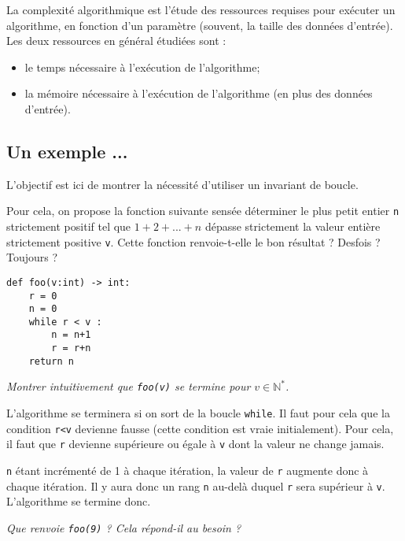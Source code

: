 \begin{defi}[Complexité]
  La complexité algorithmique est l'étude des ressources requises pour exécuter un algorithme, en fonction d'un paramètre (souvent, la taille des données d'entrée). Les deux ressources en général étudiées sont :
\begin{itemize}
\item le temps nécessaire à l'exécution de l'algorithme;
\item la mémoire nécessaire à l'exécution de l'algorithme (en plus des données d'entrée).
\end{itemize}
\end{defi}

\subsection{Un exemple ...}
\begin{obj}

L'objectif est ici de montrer la nécessité d'utiliser un invariant de boucle.

Pour cela, on propose la fonction suivante sensée déterminer le plus petit entier \texttt{n} strictement positif tel que $1 + 2 + . . . + n$ dépasse strictement la valeur entière strictement positive \texttt{v}. Cette fonction renvoie-t-elle le bon résultat ? Desfois ? Toujours ?
\end{obj}
\begin{lstlisting}
def foo(v:int) -> int:
    r = 0
    n = 0
    while r < v : 
        n = n+1
        r = r+n
    return n
\end{lstlisting}

\textit{Montrer intuitivement que \texttt{foo(v)} se termine pour $v\in\mathbb{N}^*$.}

L'algorithme se terminera si on sort de la boucle \texttt{while}. Il faut pour cela que la condition \texttt{r<v} devienne fausse (cette condition est vraie initialement). Pour cela, il faut que \texttt{r} devienne supérieure ou égale à \texttt{v} dont la valeur ne change jamais. 

\texttt{n} étant incrémenté de 1 à chaque itération, la valeur de \texttt{r} augmente donc à chaque itération. Il y aura donc un rang \texttt{n} au-delà duquel \texttt{r} sera supérieur à \texttt{v}. L'algorithme se termine donc. 

\bigskip

\textit{Que renvoie \texttt{foo(9)} ? Cela répond-il au besoin ?}


